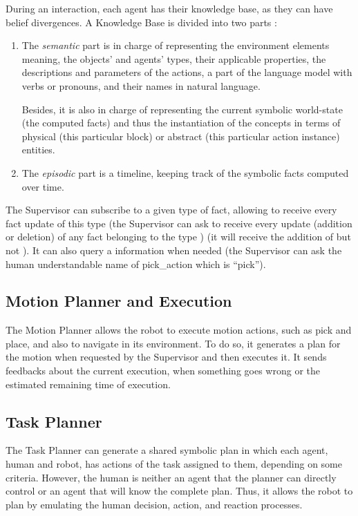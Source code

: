 \documentclass[a4paper,11pt,twoside]{StyleThese}
\begin{document}
During an interaction, each agent has their knowledge base, as they can have belief divergences. A Knowledge Base is divided into two parts :
\begin{enumerate}
	\item The \textit{semantic} part is in charge of representing the environment elements meaning, the objects' and agents' types, their applicable properties, the descriptions and parameters of the actions, a part of the language model with verbs or pronouns, and their names in natural language. 
	
	Besides, it is also in charge of representing the current symbolic world-state (the computed facts) and thus the instantiation of the concepts in terms of physical (\eg this particular block) or abstract (\eg this particular action instance) entities.
	\item  The \textit{episodic} part is a timeline, keeping track of the symbolic facts computed over time.
\end{enumerate}

The Supervisor can subscribe to a given type of fact, allowing to receive every fact update of this type (\eg the Supervisor can ask to receive every update (addition or deletion) of any fact belonging to the type ) (\eg it will receive the addition of  but not ). It can also query a information when needed (\eg the Supervisor can ask the human understandable name of pick\_action which is ``pick'').

\subsection{Motion Planner and Execution}
The Motion Planner allows the robot to execute motion actions, such as pick and place, and also to navigate in its environment. To do so, it generates a plan for the motion when requested by the Supervisor and then executes it. It sends feedbacks about the current execution, \eg when something goes wrong or the estimated remaining time of execution.

\subsection{Task Planner}
The Task Planner can generate a shared symbolic plan in which each agent, human and robot, has actions of the task assigned to them, depending on some criteria. However, the human is neither an agent that the planner can directly control or an agent that will know the complete plan. Thus, it allows the robot to plan by emulating the human decision, action, and reaction processes. 
\end{document}
